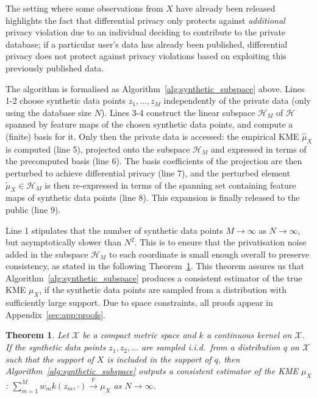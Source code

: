\documentclass{article}
\newcommand{\calH}{\mathcal{H}}			%
\newcommand{\calX}{\mathcal{X}}			%
\newcommand{\IP}{\mathbb{P}}  			%
\theoremstyle{plain}
\newtheorem{theorem}{Theorem}
\theoremstyle{remark}
\theoremstyle{definition}
\begin{document}
The setting where some observations from $X$ have already been released highlights the fact that differential privacy only protects against \emph{additional} privacy violation due to an individual deciding to contribute to the private database; if a particular user's data has already been published, differential privacy does not protect against privacy violations based on exploiting this previously published data.

The algorithm is formalised as Algorithm~\ref{alg:synthetic_subspace} above. Lines 1-2 choose synthetic data points $z_1, \ldots, z_M$ independently of the private data (only using the database size $N$). Lines 3-4 construct the linear subspace $\calH_M$ of $\calH$ spanned by feature maps of the chosen synthetic data points, and compute a (finite) basis for it. Only then the private data is accessed: the empirical KME $\hat{\mu}_X$ is computed (line 5), projected onto the subspace $\calH_M$ and expressed in terms of the precomputed basis (line 6). The basis coefficients of the projection are then perturbed to achieve differential privacy (line 7), and the perturbed element $\tilde{\mu}_X \in \calH_M$ is then re-expressed in terms of the spanning set containing feature maps of synthetic data points (line 8). This expansion is finally released to the public (line 9).

Line 1 stipulates that the number of synthetic data points $M \to \infty$ as $N \to \infty$, but asymptotically slower than $N^2$. This is to ensure that the privatisation noise added in the subspace $\calH_M$ to each coordinate is small enough overall to preserve consistency, as stated in the following Theorem~\ref{thm:synthetic_subspace_consistency}. This theorem assures us that Algorithm~\ref{alg:synthetic_subspace} produces a consistent estimator of the true KME $\mu_X$, if the synthetic data points are sampled from a distribution with sufficiently large support. Due to space constraints, all proofs appear in Appendix~\ref{sec:app:proofs}.

\begin{theorem}
	\label{thm:synthetic_subspace_consistency}
	Let $\calX$ be a compact metric space and $k$ a continuous kernel on $\calX$. If the synthetic data points $z_1, z_2, \ldots$ are sampled i.i.d.~from a distribution $q$ on $\calX$ such that the support of $X$ is included in the support of $q$, then Algorithm~\ref{alg:synthetic_subspace} outputs a consistent estimator of the KME $\mu_X$: $\sum_{m = 1}^M w_m k(z_m, \cdot) \stackrel{\IP}{\to} \mu_X$ as $N \to \infty$.
\end{theorem}
\end{document}
